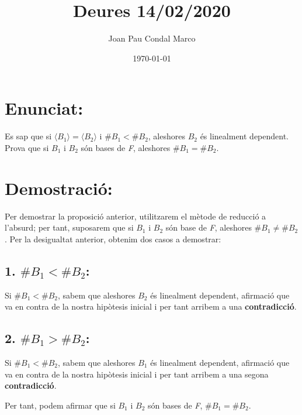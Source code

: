 \documentclass[a4paper, 11pt]{article}
\title{Deures 14/02/2020}
\author{Joan Pau Condal Marco}
\date{\today}
\begin{document}
    \maketitle
    \justify

    \section*{Enunciat:}
        Es sap que si ${\langle B_1\rangle=\langle B_2\rangle}$ i ${\#B_1 < \#B_2}$, aleshores ${B_2}$ \'es linealment dependent.\\
        Prova que si ${B_1}$ i ${B_2}$ s\'on bases de \emph{F}, aleshores ${\#B_1 = \#B_2}$.

    \section*{Demostraci\'o:}
        Per demostrar la proposici\'o anterior, utilitzarem el m\`etode de reducci\'o a l'absurd; per tant, suposarem que si ${B_1}$ i ${B_2}$ s\'on base de \emph{F}, aleshores ${\# B_1 \neq \# B_2}$. Per la desigualtat anterior, obtenim dos casos a demostrar:

        \subsection*{1. ${\# B_1 < \# B_2}$:}
            Si ${\# B_1 < \# B_2}$, sabem que aleshores ${B_2}$ \'es linealment dependent, afirmaci\'o que va en contra de la nostra hip\`otesis inicial i per tant arribem a una \textbf{contradicci\'o}.
            
        \subsection*{2. ${\# B_1 > \# B_2}$:}
            Si ${\# B_1 < \# B_2}$, sabem que aleshores ${B_1}$ \'es linealment dependent, afirmaci\'o que va en contra de la nostra hip\`otesis inicial i per tant arribem a una segona \textbf{contradicci\'o}.\\
    
    \begin{center}
        Per tant, podem afirmar que si ${B_1}$ i ${B_2}$ s\'on bases de \emph{F}, ${\#B_1 = \#B_2}$. 
    \end{center}
\end{document}
